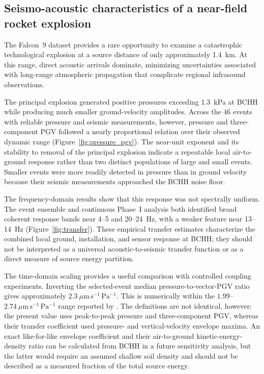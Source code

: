 \documentclass[]{seismica}
\begin{document}
\subsection{Seismo-acoustic characteristics of a near-field rocket explosion}
\label{sec:discussion_characteristics}

The Falcon~9 dataset provides a rare opportunity to examine a catastrophic technological explosion at a source distance of only approximately 1.4~km. At this range, direct acoustic arrivals dominate, minimizing uncertainties associated with long-range atmospheric propagation that complicate regional infrasound observations.

The principal explosion generated positive pressures exceeding 1.3~kPa at
BCHH while producing much smaller ground-velocity amplitudes. Across the 46
events with reliable pressure and seismic measurements, however, pressure and
three-component PGV followed a nearly proportional relation over their observed
dynamic range (Figure~\ref{fig:pressure_pgv}). The near-unit exponent and its
stability to removal of the principal explosion indicate a repeatable local
air-to-ground response rather than two distinct populations of large and small
events. Smaller events were more readily detected in pressure than in ground
velocity because their seismic measurements approached the BCHH noise floor.

The frequency-domain results show that this response was not spectrally
uniform. The event ensemble and continuous Phase~I analysis both identified
broad coherent response bands near 4--5 and 20--24~Hz, with a weaker feature
near 13--14~Hz (Figure~\ref{fig:transfer}). These empirical transfer estimates
characterize the combined local ground, installation, and sensor response at
BCHH; they should not be interpreted as a universal acoustic-to-seismic
transfer function or as a direct measure of source energy partition.

The time-domain scaling provides a useful comparison with controlled coupling
experiments. Inverting the selected-event median pressure-to-vector-PGV ratio
gives approximately $2.3~\mu\mathrm{m\,s^{-1}\,Pa^{-1}}$. This is numerically
within the $1.99$--$2.74~\mu\mathrm{m\,s^{-1}\,Pa^{-1}}$ range reported by
\citet{novoselov_ground_coupling_2020}. The definitions are not identical,
however: the present value uses peak-to-peak pressure and three-component PGV,
whereas their transfer coefficient used pressure- and vertical-velocity
envelope maxima. An exact like-for-like envelope coefficient and their
air-to-ground kinetic-energy-density ratio can be calculated from BCHH in a
future sensitivity analysis, but the latter would require an assumed shallow
soil density and should not be described as a measured fraction of the total
source energy.
\end{document}
